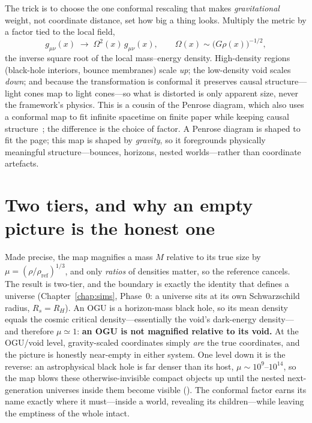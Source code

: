 The trick is to choose the one conformal rescaling that makes \emph{gravitational}
weight, not coordinate distance, set how big a thing looks. Multiply the metric by
a factor tied to the local field,
\[
  g_{\mu\nu}(x)\;\to\;\Omega^2(x)\,g_{\mu\nu}(x),
  \qquad \Omega(x)\sim\bigl(G\rho(x)\bigr)^{-1/2},
\]
the inverse square root of the local mass--energy density. High-density regions
(black-hole interiors, bounce membranes) scale \emph{up}; the low-density void
scales \emph{down}; and because the transformation is conformal it preserves causal
structure---light cones map to light cones---so what is distorted is only apparent
size, never the framework's physics. This is a cousin of the Penrose diagram, which
also uses a conformal map to fit infinite spacetime on finite paper while keeping
causal structure~\citep{penrose2010}; the difference is the choice of factor. A
Penrose diagram is shaped to fit the page; this map is shaped by \emph{gravity}, so
it foregrounds physically meaningful structure---bounces, horizons, nested
worlds---rather than coordinate artefacts.

\section{Two tiers, and why an empty picture is the honest one}
\label{sec:two-tier}

Made precise, the map magnifies a mass $M$ relative to its true size by
$\mu=(\rho/\rho_{\mathrm{ref}})^{1/3}$, and only \emph{ratios} of densities matter,
so the reference cancels. The result is two-tier, and the boundary is exactly the
identity that defines a universe (Chapter~\ref{chap:sims}, Phase~0: a universe sits
at its own Schwarzschild radius, $R_s=R_H$). An OGU is a horizon-mass black hole,
so its mean density equals the cosmic critical density---essentially the void's
dark-energy density---and therefore $\mu\simeq1$: \textbf{an OGU is not magnified
relative to its void.} At the OGU/void level, gravity-scaled coordinates simply
\emph{are} the true coordinates, and the picture is honestly near-empty in either
system. One level down it is the reverse: an astrophysical black hole is far denser
than its host, $\mu\sim10^{9}$--$10^{14}$, so the map blows these otherwise-invisible
compact objects up until the nested next-generation universes inside them become
visible (). The conformal factor earns its name exactly
where it must---inside a world, revealing its children---while leaving the
emptiness of the whole intact.

